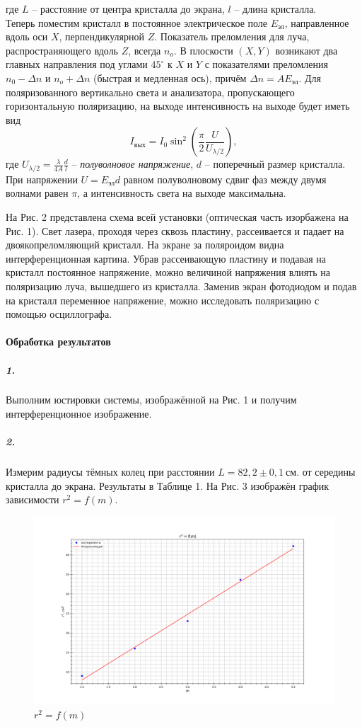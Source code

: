 \documentclass[a4paper,12pt]{article}
\begin{document}
где $L$ -- расстояние от центра кристалла до экрана, $l$ -- длина кристалла.\\
Теперь поместим кристалл в постоянное электрическое поле $E_{\text{эл}}$, направленное вдоль оси $X$, перпендикулярной $Z$. Показатель преломления для луча, распространяющего вдоль $Z$, всегда $n_o$. В плоскости $(X,Y)$ возникают два главных направления под углами $45^\circ$ к $X$ и $Y$ с показателями преломления $n_0 - \Delta n$ и $n_o + \Delta n$ (быстрая и медленная ось), причём $\Delta n = A E_{\text{эл}}$. Для поляризованного вертикально света и анализатора, пропускающего горизонтальную поляризацию, на выходе интенсивность на выходе будет иметь вид
\begin{equation}
I_{\text{вых}} = I_0 \sin^2 \left(\dfrac{\pi}{2} \dfrac{U}{U_{\lambda/2}} \right),
\end{equation}
где $U_{\lambda/2} = \frac{\lambda}{4A}\frac{d}{l}$ -- \textit{полуволновое напряжение}, $d$ -- поперечный размер кристалла.  При напряжении $U = E_{\text{эл}}d$ равном полуволновому сдвиг фаз между двумя волнами равен $\pi$, а интенсивность света на выходе максимальна. 


На Рис. 2 представлена схема всей установки (оптическая часть изорбажена на Рис. 1). Свет лазера, проходя через сквозь пластину, рассеивается и падает на двоякопреломляющий кристалл. На экране за поляроидом видна интерференционная картина. Убрав рассеивающую пластину и подавая на кристалл постоянное напряжение, можно величиной напряжения влиять на поляризацию луча, вышедшего из кристалла. Заменив экран фотодиодом и подав на кристалл переменное напряжение, можно исследовать поляризацию с помощью осциллографа.
\paragraph{Обработка результатов}
\subparagraph{1.} Выполним юстировки системы, изображённой на Рис. 1 и получим интерференционное изображение.
\subparagraph{2.} Измерим радиусы тёмных колец при расстоянии $L=82,2\pm 0,1 ~ см$. от середины кристалла до экрана. Результаты в Таблице 1. На Рис. 3 изображён график зависимости $r^2 = f(m)$.

\begin{figure}[h!]
	\centering
	\includegraphics[width=1\linewidth]{graph1.png}
	\caption{$r^2=f(m)$}
	\label{labA}
\end{figure}
\end{document}
